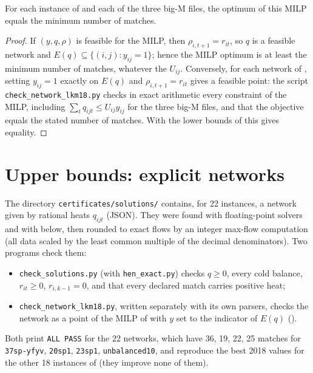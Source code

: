 \documentclass[11pt,a4paper]{report}
\newcommand*{\inst}[1]{\texttt{#1}}
\begin{document}
\begin{proposition}\label{prop:milp}
For each instance of  and each of the three big-M files, the optimum of this MILP equals the minimum
number of matches.
\end{proposition}
\begin{proof}
If $(y,q,\rho)$ is feasible for the MILP, then $\rho_{i,t+1}=r_{it}$, so $q$ is a feasible network and
$E(q)\subseteq\{(i,j):y_{ij}=1\}$; hence the MILP optimum is at least the minimum number of matches, whatever the
$U_{ij}$. Conversely, for each network of , setting $y_{ij}=1$ exactly on $E(q)$ and
$\rho_{i,t+1}=r_{it}$ gives a feasible point: the script \texttt{check\_network\_lkm18.py} checks in exact
arithmetic every constraint of the MILP, including $\sum_tq_{ijt}\le U_{ij}y_{ij}$ for the three big-M files, and that
the objective equals the stated number of matches. With the lower bounds of  this gives
equality.
\end{proof}

\section{Upper bounds: explicit networks}\label{sec:ub}

The directory \texttt{certificates/solutions/} contains, for 22 instances, a network given by rational heats
$q_{ijt}$ (JSON). They were found with floating-point solvers and with  below, then rounded to
exact flows by an integer max-flow computation (all data scaled by the least common multiple of the decimal
denominators). Two programs check them:
\begin{itemize}
\item \texttt{check\_solutions.py} (with \texttt{hen\_exact.py}) checks $q\ge0$, every cold balance, $r_{it}\ge0$,
$r_{i,k-1}=0$, and that every declared match carries positive heat;
\item \texttt{check\_network\_lkm18.py}, written separately with its own parsers, checks the network as a point of
the MILP of \textcite{LKM2018} with $y$ set to the indicator of $E(q)$ ().
\end{itemize}
Both print \texttt{ALL PASS} for the 22 networks, which have 36, 19, 22, 25 matches for \inst{37sp-yfyv},
\inst{20sp1}, \inst{23sp1}, \inst{unbalanced10}, and reproduce the best 2018 values for the other 18 instances of
 (they improve none of them).
\end{document}
